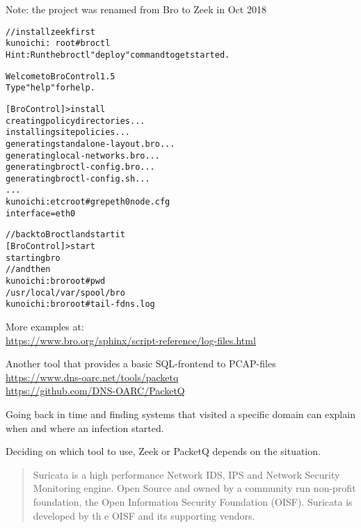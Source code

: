 \documentclass[20pt,landscape,a4paper,footrule]{foils}
\begin{document}
\centerline{Note: the project was renamed from Bro to Zeek in Oct 2018}

\begin{alltt}\small
// install zeek first
kunoichi:~ root# broctl
Hint: Run the broctl "deploy" command to get started.

Welcome to BroControl 1.5
Type "help" for help.

[BroControl] > install
creating policy directories ...
installing site policies ...
generating standalone-layout.bro ...
generating local-networks.bro ...
generating broctl-config.bro ...
generating broctl-config.sh ...
...
kunoichi:etc root# grep eth0 node.cfg
interface=eth0
\end{alltt}


\begin{alltt}\small
// back to Broctl and start it
[BroControl] > start
starting bro
// and then
kunoichi:bro root# pwd
/usr/local/var/spool/bro
kunoichi:bro root# tail -f dns.log
\end{alltt}

More examples at:\\
\url{https://www.bro.org/sphinx/script-reference/log-files.html}



Another tool that provides a basic SQL-frontend to PCAP-files\\
\url{https://www.dns-oarc.net/tools/packetq}\\
\url{https://github.com/DNS-OARC/PacketQ}

Going back in time and finding systems that visited a specific domain can explain when and where an infection started.

Deciding on which tool to use, Zeek or PacketQ depends on the situation.


\begin{quote}
Suricata is a high performance Network IDS, IPS and Network Security Monitoring engine. Open Source and owned by a
 community run non-profit foundation, the Open Information Security Foundation (OISF). Suricata is developed by th
e OISF and its supporting vendors.
\end{quote}

\end{document}
